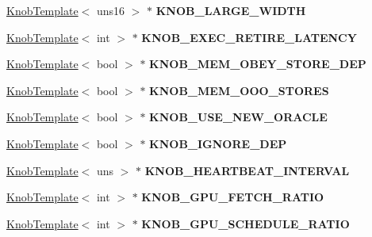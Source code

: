 \begin{DoxyCompactItemize}
\item 
\hypertarget{classall__knobs__c_ae344edfc95b1215e15103f411e6db31a}{
\hyperlink{classKnobTemplate}{KnobTemplate}$<$ uns16 $>$ $\ast$ {\bfseries KNOB\_\-LARGE\_\-WIDTH}}
\label{classall__knobs__c_ae344edfc95b1215e15103f411e6db31a}

\item 
\hypertarget{classall__knobs__c_a568caa14adeaebb18ecd02026eb4a369}{
\hyperlink{classKnobTemplate}{KnobTemplate}$<$ int $>$ $\ast$ {\bfseries KNOB\_\-EXEC\_\-RETIRE\_\-LATENCY}}
\label{classall__knobs__c_a568caa14adeaebb18ecd02026eb4a369}

\item 
\hypertarget{classall__knobs__c_afc2421a5abd54aec28fdf68b43a273a0}{
\hyperlink{classKnobTemplate}{KnobTemplate}$<$ bool $>$ $\ast$ {\bfseries KNOB\_\-MEM\_\-OBEY\_\-STORE\_\-DEP}}
\label{classall__knobs__c_afc2421a5abd54aec28fdf68b43a273a0}

\item 
\hypertarget{classall__knobs__c_a7a533ef1bc4e0aee27ebbbc02f2c6e69}{
\hyperlink{classKnobTemplate}{KnobTemplate}$<$ bool $>$ $\ast$ {\bfseries KNOB\_\-MEM\_\-OOO\_\-STORES}}
\label{classall__knobs__c_a7a533ef1bc4e0aee27ebbbc02f2c6e69}

\item 
\hypertarget{classall__knobs__c_ab831e1adc87c3f7f7c4688f65117a48a}{
\hyperlink{classKnobTemplate}{KnobTemplate}$<$ bool $>$ $\ast$ {\bfseries KNOB\_\-USE\_\-NEW\_\-ORACLE}}
\label{classall__knobs__c_ab831e1adc87c3f7f7c4688f65117a48a}

\item 
\hypertarget{classall__knobs__c_adec0427fede9c9b24abff4fa96981beb}{
\hyperlink{classKnobTemplate}{KnobTemplate}$<$ bool $>$ $\ast$ {\bfseries KNOB\_\-IGNORE\_\-DEP}}
\label{classall__knobs__c_adec0427fede9c9b24abff4fa96981beb}

\item 
\hypertarget{classall__knobs__c_aafdcb1db6973b545603053bcbdb813f9}{
\hyperlink{classKnobTemplate}{KnobTemplate}$<$ uns $>$ $\ast$ {\bfseries KNOB\_\-HEARTBEAT\_\-INTERVAL}}
\label{classall__knobs__c_aafdcb1db6973b545603053bcbdb813f9}

\item 
\hypertarget{classall__knobs__c_abc17e99440216e92dd6cd51b5c7c6cfd}{
\hyperlink{classKnobTemplate}{KnobTemplate}$<$ int $>$ $\ast$ {\bfseries KNOB\_\-GPU\_\-FETCH\_\-RATIO}}
\label{classall__knobs__c_abc17e99440216e92dd6cd51b5c7c6cfd}

\item 
\hypertarget{classall__knobs__c_ab401bab322a64300c86aef037c1cf666}{
\hyperlink{classKnobTemplate}{KnobTemplate}$<$ int $>$ $\ast$ {\bfseries KNOB\_\-GPU\_\-SCHEDULE\_\-RATIO}}
\label{classall__knobs__c_ab401bab322a64300c86aef037c1cf666}


\end{DoxyCompactItemize}
